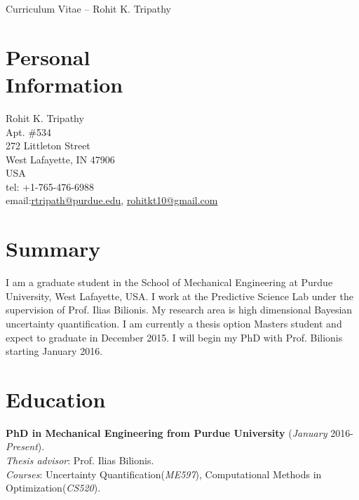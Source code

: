 \documentclass[margin,line,a4paper]{resume}
\begin{document}
{\sc \Large Curriculum Vitae -- Rohit K. Tripathy}
\begin{resume}
    \vspace{0.5cm}




    \section{\mysidestyle Personal\\Information}%
    Rohit K. Tripathy \\
    Apt. \#534  \\ 
    272 Littleton Street \\ 
    West Lafayette, IN 47906 \\
    USA \\ 
    tel: +1-765-476-6988 \\
    email:\href{mailto:rtripath@purdue.edu}{rtripath@purdue.edu}, \href{mailto:rohitkt10@gmail.com}{rohitkt10@gmail.com} \\
    



    \section{\mysidestyle Summary}
    I am a graduate student in the School of Mechanical Engineering at Purdue University, West Lafayette, USA. I work at the Predictive Science Lab under the supervision of Prof. Ilias Bilionis. My research area is high dimensional Bayesian uncertainty quantification. I am currently a thesis option Masters student and expect to graduate in December 2015. I will begin my PhD with Prof. Bilionis starting January 2016.



    \section{\mysidestyle Education} 
    \textbf{PhD in Mechanical Engineering from
    Purdue University} (\textit{January} 2016-\textit{Present}). \\
    \textit{Thesis advisor}: Prof. Ilias Bilionis. \\
    \textit{Courses}: Uncertainty Quantification(\textit{ME597}),  Computational Methods in Optimization(\textit{CS520}). \\
    

\end{resume}
\end{document}

